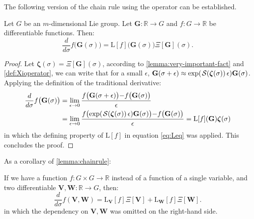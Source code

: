 The following version of the chain rule using the  operator can be established.

\begin{lemma}\label{lemma:chainrule}
    Let $G$ be an $m$-dimensional Lie group. Let $\mathbf{G} : \mathbb{R} \to G$ and $f: G \to \mathbb{R}$ be differentiable functions. Then:
    \begin{equation}
       \frac{d}{d\sigma} f\bigl(\mathbf{G}(\sigma)\bigr) = \text{L}[f]\bigl(\mathbf{G}(\sigma)\bigr)\Xi[\mathbf{G}](\sigma).
    \end{equation}
\end{lemma}
\begin{proof}
    Let $\boldsymbol{\zeta}(\sigma) = \Xi[\mathbf{G}](\sigma)$, according to \cref{lemma:very-important-fact} and \cref{def:Xioperator}, we can write that for a small $\epsilon$, $\mathbf{G}(\sigma+\epsilon) \approx \exp(\SL[\boldsymbol{\zeta}(\sigma)]\epsilon)\mathbf{G}(\sigma)$. 
    Applying the definition of the traditional derivative:
    \begin{align}
        \begin{split}
            \frac{d}{d\sigma} f\bigl(\mathbf{G}(\sigma)\bigr) &= \lim_{\epsilon \rightarrow 0} \frac{f\bigl(\mathbf{G}(\sigma+\epsilon)\bigr){-}f\bigl(\mathbf{G}(\sigma)\bigr)}{\epsilon}\\
            &  =
            \lim_{\epsilon \rightarrow 0} \frac{f\bigl(\exp(\SL[\boldsymbol{\zeta}(\sigma)]\epsilon)\mathbf{G}(\sigma)\bigr){-}f\bigl(\mathbf{G}(\sigma)\bigr)}{\epsilon} = \text{L}[f](\mathbf{G}) \boldsymbol{\zeta}(\sigma)      
        \end{split}
    \end{align}
    in which the defining property of $\text{L}[f]$ in equation \eqref{eq:Leq} was applied. This concludes the proof.
\end{proof}

As a corollary of \cref{lemma:chainrule}:

\begin{corollary} \label{corol:corol1} If we have a function $f: G \times G \to \mathbb{R}$ instead of a function of a single variable, and two differentiable $\mathbf{V}, \mathbf{W} : \mathbb{R} \to G$, then:
\begin{equation}
   \frac{d}{d \sigma} f(\mathbf{V},\mathbf{W}) {=} \text{L}_{\mathbf{V}}[f] \Xi[\mathbf{V}] {+} \text{L}_{\mathbf{W}}[f] \Xi[\mathbf{W}].
\end{equation}
in which the dependency on $\mathbf{V}, \mathbf{W}$ was omitted on the right-hand side. 
\end{corollary}

